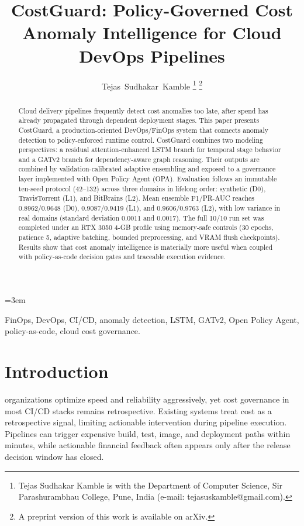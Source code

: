 \documentclass[journal]{IEEEtran}
\title{CostGuard: Policy-Governed Cost Anomaly Intelligence for Cloud DevOps Pipelines}
\author{Tejas\ Sudhakar\ Kamble
\thanks{Tejas Sudhakar Kamble is with the Department of Computer Science, Sir Parashurambhau College, Pune, India (e-mail: tejasuskamble@gmail.com).}
\thanks{A preprint version of this work is available on arXiv.}}
\begin{document}
\maketitle

\setlength{\columnsep}{0.24in}
\sloppy
\emergencystretch=3em

\begin{abstract}
Cloud delivery pipelines frequently detect cost anomalies too late, after spend has already propagated through dependent deployment stages. This paper presents CostGuard, a production-oriented DevOps/FinOps system that connects anomaly detection to policy-enforced runtime control. CostGuard combines two modeling perspectives: a residual attention-enhanced LSTM branch for temporal stage behavior and a GATv2 branch for dependency-aware graph reasoning. Their outputs are combined by validation-calibrated adaptive ensembling and exposed to a governance layer implemented with Open Policy Agent (OPA). Evaluation follows an immutable ten-seed protocol (42--132) across three domains in lifelong order: synthetic (D0), TravisTorrent (L1), and BitBrains (L2). Mean ensemble F1/PR-AUC reaches 0.8962/0.9648 (D0), 0.9087/0.9419 (L1), and 0.9606/0.9763 (L2), with low variance in real domains (standard deviation 0.0011 and 0.0017). The full 10/10 run set was completed under an RTX 3050 4-GB profile using memory-safe controls (30 epochs, patience 5, adaptive batching, bounded preprocessing, and VRAM flush checkpoints). Results show that cost anomaly intelligence is materially more useful when coupled with policy-as-code decision gates and traceable execution evidence.
\end{abstract}

\begin{IEEEkeywords}
FinOps, DevOps, CI/CD, anomaly detection, LSTM, GATv2, Open Policy Agent, policy-as-code, cloud cost governance.
\end{IEEEkeywords}

\FloatBarrier
\section{Introduction}
 organizations optimize speed and reliability aggressively, yet cost governance in most CI/CD stacks remains retrospective. Existing systems treat cost as a retrospective signal, limiting actionable intervention during pipeline execution. Pipelines can trigger expensive build, test, image, and deployment paths within minutes, while actionable financial feedback often appears only after the release decision window has closed.
\end{document}
